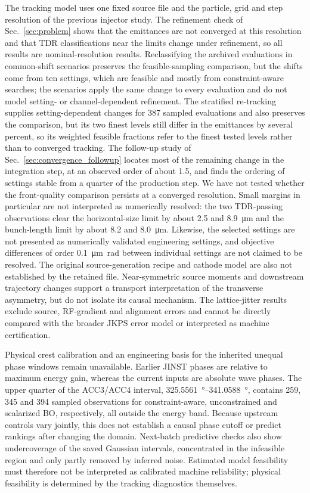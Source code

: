 \documentclass[aps,prab,reprint,superscriptaddress,amsmath,amssymb,floatfix]{revtex4-2}
\begin{document}
The tracking model uses one fixed source file and the particle, grid and step resolution of the
previous injector study. The refinement check of Sec.~\ref{sec:problem} shows that the
emittances are not converged at this resolution and that TDR classifications near the limits
change under refinement, so all results are nominal-resolution results. Reclassifying the
archived evaluations in common-shift scenarios preserves the feasible-sampling comparison, but
the shifts come from ten settings, which are feasible and mostly from constraint-aware searches;
the scenarios apply the same change to every evaluation and do not model setting- or
channel-dependent refinement. The stratified re-tracking supplies setting-dependent changes for
387 sampled evaluations and also preserves the comparison, but its two finest levels still
differ in the emittances by several percent, so its weighted feasible fractions refer to the
finest tested levels rather than to converged tracking. The follow-up study of
Sec.~\ref{sec:convergence_followup} locates most of the remaining change in the integration
step, at an observed order of about 1.5, and finds the ordering of settings stable from a
quarter of the production step. We have not tested whether the front-quality comparison persists
at a converged resolution. Small margins in particular are not interpreted as numerically
resolved: the two TDR-passing observations clear the horizontal-size limit by about 2.5 and
\SI{8.9}{\micro\metre} and the bunch-length limit by about 8.2 and \SI{8.0}{\micro\metre}.
Likewise, the selected settings are not presented as numerically validated engineering settings,
and objective differences of order \SI{0.1}{\micro\metre\radian} between individual settings are
not claimed to be resolved. The original source-generation recipe and cathode model are also not
established by the retained file. Near-symmetric source moments and downstream trajectory
changes support a transport interpretation of the transverse asymmetry, but do not isolate its
causal mechanism. The lattice-jitter results exclude source, RF-gradient and alignment errors
and cannot be directly compared with the broader JKPS error model or interpreted as machine
certification.

Physical crest calibration and an engineering basis for the inherited unequal phase windows
remain unavailable. Earlier JINST phases are relative to maximum energy gain, whereas the
current inputs are absolute wave phases. The upper quarter of the ACC3/ACC4 interval,
\SIrange{325.5561}{341.0588}{\degree}, contains 259, 345 and 394 sampled observations for
constraint-aware, unconstrained and scalarized BO, respectively, all outside the energy band.
Because upstream controls vary jointly, this does not establish a causal phase cutoff or
predict rankings after changing the domain. Next-batch predictive checks also show
undercoverage of the saved Gaussian intervals, concentrated in the infeasible region and
only partly removed by inferred noise. Estimated model feasibility must therefore not be
interpreted as calibrated machine reliability; physical feasibility is determined by the
tracking diagnostics themselves.
\end{document}

